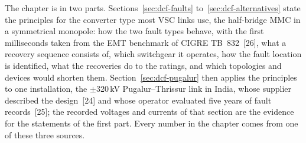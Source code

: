 The chapter is in two parts. Sections~\ref{sec:dcf-faults}
to~\ref{sec:dcf-alternatives} state the principles for the converter type
most VSC links use, the half-bridge MMC in a symmetrical monopole: how the
two fault types behave, with the first milliseconds taken from the EMT
benchmark of CIGRE TB~832~[26], what a recovery sequence consists of, which
switchgear it operates, how the fault location is identified, what the
recoveries do to the ratings, and which topologies and devices would
shorten them. Section~\ref{sec:dcf-pugalur} then applies the principles to
one installation, the $\pm$320\,kV Pugalur--Thrissur link in India, whose
supplier described the design~[24] and whose operator evaluated five years
of fault records~[25]; the recorded voltages and currents of that section
are the evidence for the statements of the first part. Every number in the
chapter comes from one of these three sources.








